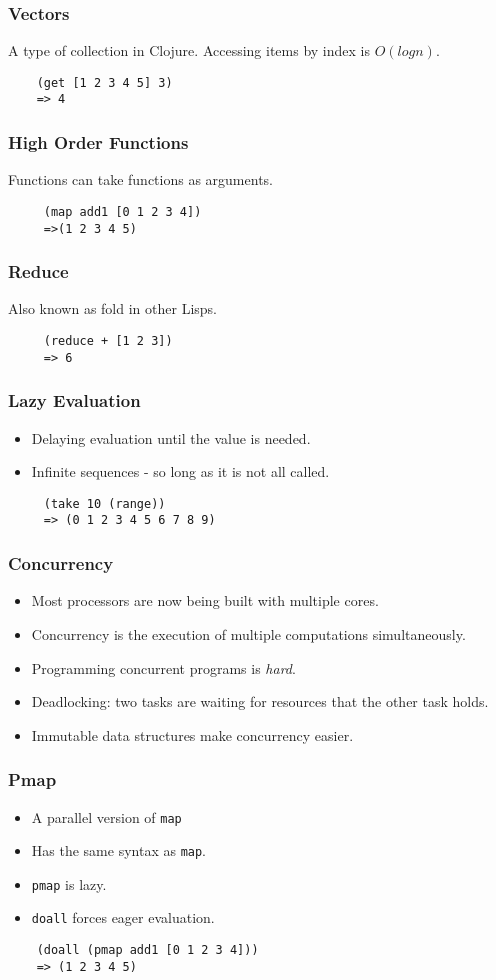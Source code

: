 \documentclass{beamer}
\newcommand{\comment}[1]{{\bf \tt  {#1}}}
\newcommand{\hfcomment}[1]{\textcolor{Teal}{\comment{Henry: {#1}}}}
\newcommand{\clocode}[1]{{\texttt {#1}}}
\begin{document}
\begin{frame}[fragile]
\frametitle{Vectors}

A type of collection in Clojure.
Accessing items by index is $O(log n)$.
	\begin{verbatim}
	(get [1 2 3 4 5] 3)	
	=> 4
	\end{verbatim}
\end{frame}
\begin{frame}[fragile]
\frametitle{High Order Functions}
 Functions can take functions as arguments.
	\begin{verbatim}
	 (map add1 [0 1 2 3 4])
	 =>(1 2 3 4 5)
	\end{verbatim}
\end{frame}
\begin{frame}[fragile]
\frametitle{Reduce}
Also known as fold in other Lisps.
	\begin{verbatim}
	 (reduce + [1 2 3])
	 => 6
	\end{verbatim}
\end{frame}
\begin{frame}[fragile]
\frametitle{Lazy Evaluation}
	\begin{itemize}
	  \item Delaying evaluation until the value is needed.
  	  \item Infinite sequences - so long as it is not all called.
       \end{itemize}	
	\begin{verbatim}
	 (take 10 (range))
	 => (0 1 2 3 4 5 6 7 8 9)
	\end{verbatim}
\end{frame}
\begin{frame}
\frametitle{Concurrency}
	\begin{itemize}
	 \item Most processors are now being built with multiple cores.
	 \item Concurrency is the execution of multiple computations simultaneously.
	 \item Programming concurrent programs is \textit{hard}.
	 \item Deadlocking: two tasks are waiting for resources that the other task holds.
	 \item Immutable data structures make concurrency easier.
	\end{itemize}	
\end{frame}
\begin{frame}[fragile]
\frametitle{Pmap}
	\begin{itemize}
	 \item A parallel version of \clocode{map}
	 \item Has the same syntax as \clocode{map}.
	 \item \clocode{pmap} is lazy.
	 \item \clocode{doall} forces eager evaluation. 
	\end{itemize}	
	\begin{verbatim}
	(doall (pmap add1 [0 1 2 3 4]))
	=> (1 2 3 4 5)
	\end{verbatim}
\end{frame}
\end{document}
